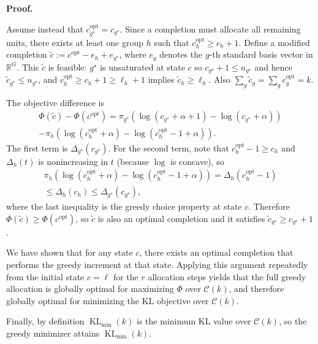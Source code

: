 \documentclass[10pt,journal]{IEEEtran}
\makeatletter
\newcommand{\1}{\mathbf{1}}
\DeclareMathOperator{\KL}{KL}
\theoremstyle{ieeethm}
\renewcommand{\IEEEproofname}{Proof}
\renewenvironment{IEEEproof}[1][\IEEEproofname]{%
  \par\pushQED{\IEEEQED}%
  \normalfont
  \topsep6\p@\@plus6\p@\relax
  \trivlist
  \item[]\textbf{#1.}\ignorespaces
}{%
  \popQED\endtrivlist\@endpefalse
}
\makeatother
\begin{document}
\begin{IEEEproof}
Assume instead that $c^{\mathrm{opt}}_{g^\star}=c_{g^\star}$. Since a completion must allocate all remaining units,
there exists at least one group $h$ such that $c^{\mathrm{opt}}_h\ge c_h+1$.
Define a modified completion $\tilde c:=c^{\mathrm{opt}}-e_h+e_{g^\star}$, where $e_g$ denotes the $g$-th
standard basis vector in $\mathbb{R}^G$.
This $\tilde c$ is feasible: $g^\star$ is unsaturated at state $c$ so $c_{g^\star}+1\le n_{g^\star}$ and hence
$\tilde c_{g^\star}\le n_{g^\star}$, and $c^{\mathrm{opt}}_h\ge c_h+1\ge \ell_h+1$ implies
$\tilde c_h\ge \ell_h$. Also $\sum_g \tilde c_g=\sum_g c^{\mathrm{opt}}_g=k$.

The objective difference is
\begin{equation*}
\begin{aligned}
\Phi(\tilde c)-\Phi(c^{\mathrm{opt}})
=
\pi_{g^\star}\!\left(\log(c_{g^\star}+\alpha+1)-\log(c_{g^\star}+\alpha)\right)\\
-
\pi_h\!\left(\log(c^{\mathrm{opt}}_h+\alpha)-\log(c^{\mathrm{opt}}_h-1+\alpha)\right).
\end{aligned}
\end{equation*}
The first term is $\Delta_{g^\star}(c_{g^\star})$.
For the second term, note that $c^{\mathrm{opt}}_h-1\ge c_h$ and $\Delta_h(t)$ is nonincreasing in $t$
(because $\log$ is concave), so
\begin{equation*}
\begin{aligned}
\pi_h\!\left(\log(c^{\mathrm{opt}}_h+\alpha)-\log(c^{\mathrm{opt}}_h-1+\alpha)\right)
=
\Delta_h(c^{\mathrm{opt}}_h-1)\\
\le
\Delta_h(c_h)
\le
\Delta_{g^\star}(c_{g^\star}),
\end{aligned}
\end{equation*}
where the last inequality is the greedy choice property at state $c$.
Therefore $\Phi(\tilde c)\ge \Phi(c^{\mathrm{opt}})$, so $\tilde c$ is also an optimal completion and it satisfies
$\tilde c_{g^\star}\ge c_{g^\star}+1$.

We have shown that for any state $c$, there exists an optimal completion that performs the greedy increment at that
state. Applying this argument repeatedly from the initial state $c=\ell$ for the $r$ allocation steps yields that
the full greedy allocation is globally optimal for maximizing $\Phi$ over $\mathcal{C}(k)$, and therefore globally
optimal for minimizing the KL objective over $\mathcal{C}(k)$.

Finally, by definition $\KL_{\min}(k)$ is the minimum KL value over $\mathcal{C}(k)$, so the greedy minimizer attains
$\KL_{\min}(k)$.
\end{IEEEproof}
\end{document}
